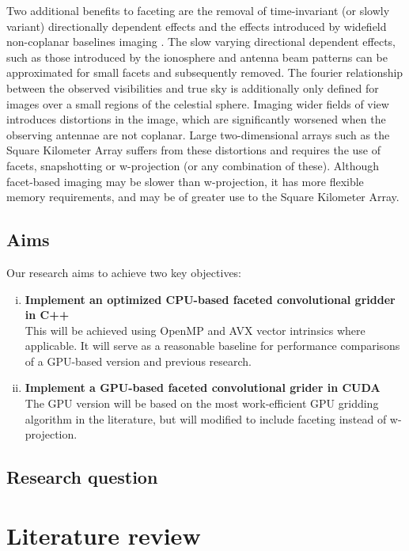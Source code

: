 \documentclass[a4paper,11pt,two column]{article}
\begin{document}
Two additional benefits to faceting are the removal of time-invariant (or slowly variant) directionally dependent effects and the effects introduced by widefield non-coplanar baselines imaging \cite{cornwell1992radio,2011A&A...527A.107S}. The slow varying directional dependent effects, 
such as those introduced by the ionosphere and antenna beam patterns can be approximated for small facets and subsequently removed. The fourier relationship between the observed visibilities and true sky is additionally only defined for images over a small regions of the celestial sphere. 
Imaging wider fields of view introduces distortions in the image, which are significantly worsened when the observing antennae are not coplanar. Large two-dimensional arrays such as the Square Kilometer Array suffers from these distortions and requires the use of facets, snapshotting or 
w-projection (or any combination of these). Although facet-based imaging may be slower than w-projection, it has more flexible memory requirements, and may be of greater use to the Square Kilometer Array.
\subsection{Aims}
Our research aims to achieve two key objectives:
\begin{enumerate}[i)]
 \item \textbf{Implement an optimized CPU-based faceted convolutional gridder in C++}\\
  This will be achieved using OpenMP and AVX vector intrinsics where applicable. It will serve as a reasonable baseline for performance comparisons of a GPU-based version and previous research.
 \item \textbf{Implement a GPU-based faceted convolutional grider in CUDA}\\
  The GPU version will be based on the most work-efficient GPU gridding algorithm in the literature, but will modified to include faceting instead of w-projection.
\end{enumerate}

\subsection{Research question}
 
\section{Literature review}
\end{document}
